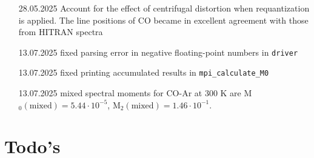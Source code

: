 \documentclass[color]{article}
\begin{document}
\begin{enumerate}
    \item [28.05.2025] Account for the effect of centrifugal distortion when requantization is applied. The line positions of CO became in excellent agreement with those from HITRAN spectra
    \item [13.07.2025] fixed parsing error in negative floating-point numbers in \texttt{driver}
    \item [13.07.2025] fixed printing accumulated results in \texttt{mpi\_calculate\_M0}
    \item [13.07.2025] mixed spectral moments for CO-Ar at 300 K are M$_0 (\textrm{mixed}) = 5.44\cdot 10^{-5}$, M$_2 (\textrm{mixed}) = 1.46\cdot 10^{-1}$.
\end{enumerate}

\section{Todo's}
\end{document}
